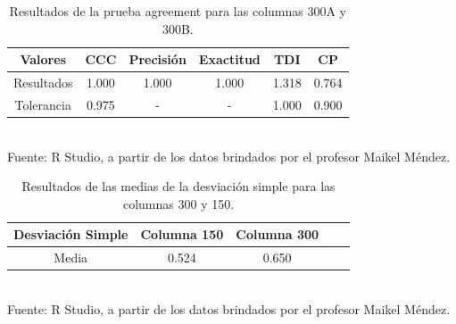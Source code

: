\documentclass[12, letterpaper]{article}
\begin{document}
\begin{table}[ht]
\centering
\caption{Resultados de la prueba agreement para las columnas 300A y 300B.}
\begin{tabular}{cccccc}
  \hline
Valores & CCC & Precisión & Exactitud & TDI & CP \\ 
  \hline
  Resultados & 1.000 & 1.000 & 1.000 & 1.318 & 0.764 \\ 
  Tolerancia & 0.975 & - & - & 1.000 & 0.900 \\ 
   \hline
\end{tabular}\\
Fuente: R Studio, a partir de los datos brindados por el profesor Maikel Méndez.
\end{table}

\begin{table}[ht]
\centering
\caption{Resultados de las medias de la desviación simple para las columnas 300 y 150.}
\begin{tabular}{ccccc}
  \hline
Desviación Simple & Columna 150 & Columna 300 \\ 
  \hline
  Media & 0.524 & 0.650
  \\ 
  \hline
\end{tabular}\\
Fuente: R Studio, a partir de los datos brindados por el profesor Maikel Méndez.
\end{table}
\end{document}
